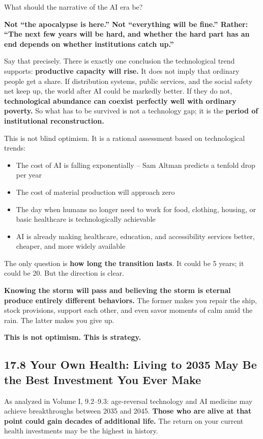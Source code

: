 \documentclass[11pt,a4paper]{article}
\begin{document}
What should the narrative of the AI era be?

\textbf{Not ``the apocalypse is here.'' Not ``everything will be fine.'' Rather: ``The next few years will be hard, and whether the hard part has an end depends on whether institutions catch up.''}

Say that precisely. There is exactly one conclusion the technological trend supports: \textbf{productive capacity will rise.} It does not imply that ordinary people get a share. If distribution systems, public services, and the social safety net keep up, the world after AI could be markedly better. If they do not, \textbf{technological abundance can coexist perfectly well with ordinary poverty.} So what has to be survived is not a technology gap; it is the \textbf{period of institutional reconstruction.}

This is not blind optimism. It is a rational assessment based on technological trends:

\begin{itemize}
  \item The cost of AI is falling exponentially -- Sam Altman predicts a tenfold drop per year
  \item The cost of material production will approach zero
  \item The day when humans no longer need to work for food, clothing, housing, or basic healthcare is technologically achievable
  \item AI is already making healthcare, education, and accessibility services better, cheaper, and more widely available
\end{itemize}

The only question is \textbf{how long the transition lasts}. It could be 5 years; it could be 20. But the direction is clear.

\textbf{Knowing the storm will pass and believing the storm is eternal produce entirely different behaviors.} The former makes you repair the ship, stock provisions, support each other, and even savor moments of calm amid the rain. The latter makes you give up.

\textbf{This is not optimism. This is strategy.}

\subsection{17.8 Your Own Health: Living to 2035 May Be the Best Investment You Ever Make}

As analyzed in Volume I, 9.2--9.3: age-reversal technology and AI medicine may achieve breakthroughs between 2035 and 2045. \textbf{Those who are alive at that point could gain decades of additional life.} The return on your current health investments may be the highest in history.
\end{document}
